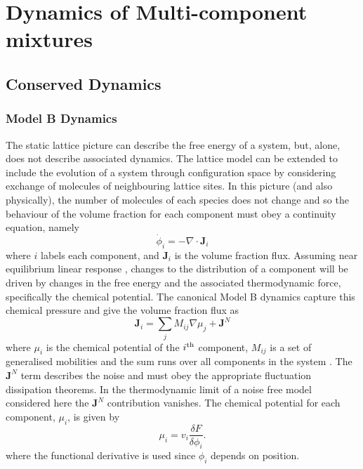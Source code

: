 \section{Dynamics of Multi-component mixtures}

\subsection{Conserved Dynamics}

\subsubsection{Model B Dynamics}
The static lattice picture can describe the free energy of a system, but, alone, does not describe associated dynamics. The lattice model can be extended to include the evolution of a system through configuration space by considering exchange of molecules of neighbouring lattice sites. In this picture (and also physically), the number of molecules of each species does not change and so the behaviour of the volume fraction for each component must obey a continuity equation, namely\cite{li_non-equilibrium_2020}
\begin{equation}
    \dot{\phi}_i = - \nabla \cdot \textbf{J}_i
    \label{eq:continuityModB}
\end{equation}
where $i$ labels each component, and $\textbf{J}_i$ is the volume fraction flux. Assuming near equilibrium linear response \cite{groot_non-equilibrium_1984}, changes to the distribution of a component will be driven by changes in the free energy and the associated thermodynamic force, specifically the chemical potential. The canonical Model B dynamics capture this chemical pressure and give the volume fraction flux as
\begin{equation}
    \textbf{J}_i = \sum_j M_{ij}\nabla\mu_j + \textbf{J}^N
    \label{eq:fluxModB}
\end{equation}
where $\mu_i$ is the chemical potential of the $i\textsuperscript{th}$ component, $M_{ij}$ is a set of generalised mobilities and the sum runs over all components in the system \cite{hohenberg_theory_1977, li_non-equilibrium_2020}. The $\textbf{J}^N$ term describes the noise and must obey the appropriate fluctuation dissipation theorems. In the thermodynamic limit of a noise free model considered here the $ \textbf{J}^N$ contribution vanishes. The chemical potential for each component, $\mu_i$, is given by
\begin{equation}
    \mu_i = v_i\frac{\delta F}{\delta \phi_i}.
\end{equation}
where the functional derivative is used since $\phi_i$ depends on position.

